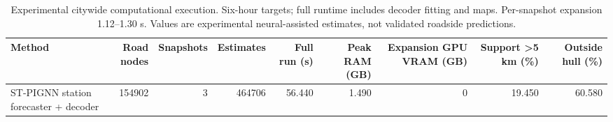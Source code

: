 \begin{table}[t]
\centering
\footnotesize
\caption{Experimental citywide computational execution. Six-hour targets; full runtime includes decoder fitting and maps. Per-snapshot expansion 1.12–1.30 s. Values are experimental neural-assisted estimates, not validated roadside predictions.}
\label{tab:t05}
\begin{tabular}{lrrrrrrrr}
\hline
Method & Road nodes & Snapshots & Estimates & Full run (s) & Peak RAM (GB) & Expansion GPU VRAM (GB) & Support >5 km (\%) & Outside hull (\%) \\
\hline
ST-PIGNN station forecaster + decoder & 154902 & 3 & 464706 & 56.440 & 1.490 & 0 & 19.450 & 60.580 \\
\hline
\end{tabular}
\end{table}
